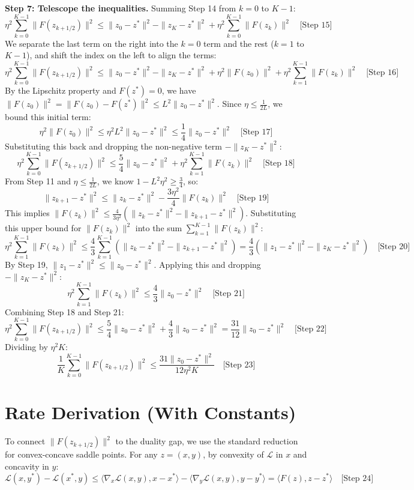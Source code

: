 \documentclass{article}
\begin{document}
\textbf{Step 7: Telescope the inequalities.} Summing Step 14 from $k=0$ to $K-1$:
$$
\eta^2 \sum_{k=0}^{K-1} \|F(z_{k+1/2})\|^2 \leq \|z_0 - z^*\|^2 - \|z_K - z^*\|^2 + \eta^2 \sum_{k=0}^{K-1} \|F(z_k)\|^2 \quad \text{[Step 15]}
$$
We separate the last term on the right into the $k=0$ term and the rest ($k=1$ to $K-1$), and shift the index on the left to align the terms:
$$
\eta^2 \sum_{k=0}^{K-1} \|F(z_{k+1/2})\|^2 \leq \|z_0 - z^*\|^2 - \|z_K - z^*\|^2 + \eta^2 \|F(z_0)\|^2 + \eta^2 \sum_{k=1}^{K-1} \|F(z_k)\|^2 \quad \text{[Step 16]}
$$
By the Lipschitz property and $F(z^*) = 0$, we have $\|F(z_0)\|^2 = \|F(z_0) - F(z^*)\|^2 \leq L^2 \|z_0 - z^*\|^2$. Since $\eta \leq \frac{1}{2L}$, we bound this initial term:
$$
\eta^2 \|F(z_0)\|^2 \leq \eta^2 L^2 \|z_0 - z^*\|^2 \leq \frac{1}{4} \|z_0 - z^*\|^2 \quad \text{[Step 17]}
$$
Substituting this back and dropping the non-negative term $-\|z_K - z^*\|^2$:
$$
\eta^2 \sum_{k=0}^{K-1} \|F(z_{k+1/2})\|^2 \leq \frac{5}{4} \|z_0 - z^*\|^2 + \eta^2 \sum_{k=1}^{K-1} \|F(z_k)\|^2 \quad \text{[Step 18]}
$$
From Step 11 and $\eta \leq \frac{1}{2L}$, we know $1 - L^2\eta^2 \geq \frac{3}{4}$, so:
$$
\|z_{k+1} - z^*\|^2 \leq \|z_k - z^*\|^2 - \frac{3\eta^2}{4} \|F(z_k)\|^2 \quad \text{[Step 19]}
$$
This implies $\|F(z_k)\|^2 \leq \frac{4}{3\eta^2}(\|z_k - z^*\|^2 - \|z_{k+1} - z^*\|^2)$. Substituting this upper bound for $\|F(z_k)\|^2$ into the sum $\sum_{k=1}^{K-1} \|F(z_k)\|^2$:
$$
\eta^2 \sum_{k=1}^{K-1} \|F(z_k)\|^2 \leq \frac{4}{3} \sum_{k=1}^{K-1} (\|z_k - z^*\|^2 - \|z_{k+1} - z^*\|^2) = \frac{4}{3}(\|z_1 - z^*\|^2 - \|z_K - z^*\|^2) \quad \text{[Step 20]}
$$
By Step 19, $\|z_1 - z^*\|^2 \leq \|z_0 - z^*\|^2$. Applying this and dropping $-\|z_K - z^*\|^2$:
$$
\eta^2 \sum_{k=1}^{K-1} \|F(z_k)\|^2 \leq \frac{4}{3} \|z_0 - z^*\|^2 \quad \text{[Step 21]}
$$
Combining Step 18 and Step 21:
$$
\eta^2 \sum_{k=0}^{K-1} \|F(z_{k+1/2})\|^2 \leq \frac{5}{4} \|z_0 - z^*\|^2 + \frac{4}{3} \|z_0 - z^*\|^2 = \frac{31}{12} \|z_0 - z^*\|^2 \quad \text{[Step 22]}
$$
Dividing by $\eta^2 K$:
$$
\frac{1}{K} \sum_{k=0}^{K-1} \|F(z_{k+1/2})\|^2 \leq \frac{31 \|z_0 - z^*\|^2}{12 \eta^2 K} \quad \text{[Step 23]}
$$

\section*{Rate Derivation (With Constants)}
To connect $\|F(z_{k+1/2})\|^2$ to the duality gap, we use the standard reduction for convex-concave saddle points. For any $z = (x, y)$, by convexity of $\mathcal{L}$ in $x$ and concavity in $y$:
$$
\mathcal{L}(x, y^*) - \mathcal{L}(x^*, y) \leq \langle \nabla_x \mathcal{L}(x, y), x - x^* \rangle - \langle \nabla_y \mathcal{L}(x, y), y - y^* \rangle = \langle F(z), z - z^* \rangle \quad \text{[Step 24]}
$$
\end{document}
